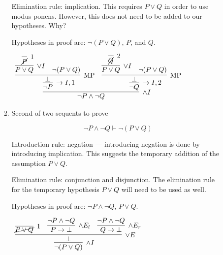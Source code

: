 \documentclass[11pt]{report}
\begin{document}
\begin{enumerate}
\begin{enumerate}
\begin{enumerate}
			\vspace{0.2cm}
			
			Elimination rule: implication. This requires $P \lor Q$ in order to use modus ponens. However, this does not need to be added to our hypotheses. Why?
		
			\vspace{0.2cm}

			Hypotheses in proof are: $\lnot(P \lor Q)$, $P$, and $Q$.

			\vspace{0.2cm}
			\begin{mdframed}
				\begin{center}
					$\begin{array}{c}
						\infer[\land I]{\lnot P \land \lnot Q}
							{\infer[\to I,1]{\lnot P}
								{\infer[\MP]{\bot}
									{\infer[\lor I]{P \lor Q}{\infer[1]{\cancel{P}}{}}
									&
									\lnot(P \lor Q)}}
							&
							\infer[\to I,2]{\lnot Q}
							{\infer[\MP]{\bot}
								{\infer[\lor I]{P \lor Q}{\infer[2]{\cancel{Q}}{}}
									&
									\lnot(P \lor Q)}}}
					\end{array}$
				\end{center}
			\end{mdframed}

			\item Second of two sequents to prove
			
			$$\lnot P \land \lnot Q \vdash \lnot(P \lor Q)$$	
			
			Introduction rule: negation --- introducing negation is done by introducing implication. This suggests the temporary addition of the assumption $P \lor Q$. 
			
			\vspace{0.2cm}
			
			Elimination rule: conjunction and disjunction. The elimination rule for the temporary hypothesis $P \lor Q$ will need to be used as well. 
		
			\vspace{0.2cm}

			Hypotheses in proof are: $\lnot P \land \lnot Q$, $P \lor Q$. 

			\vspace{0.2cm}
			
			\begin{mdframed}
				\begin{center}
					$\begin{array}{c}
						\infer[\land I]{\lnot(P \lor Q)}
							{\infer[\lor E]{\bot}
								{\infer[1]{\cancel{P \lor Q}}{}
								& 
								\infer[\land E_{l}]{P \to \bot}{\lnot P \land \lnot Q}
								&
								\infer[\land E_{r}]{Q \to \bot}{\lnot P \land \lnot Q}}}
					\end{array}$
				\end{center}
			\end{mdframed}
			\end{enumerate}
				

\end{enumerate}
\end{enumerate}
\end{document}
